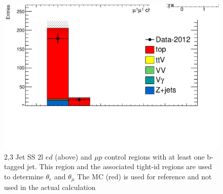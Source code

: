 \begin{figure}[htbp]
\begin{minipage}[h]{0.5\textwidth}
  \end{minipage}\hfill
  \begin{minipage}[h]{0.5\textwidth}
    \centering \includegraphics[width=\textwidth]{figs/fake/TaT-23jets-1b_nb_mm}
  \end{minipage}\hfill

  \caption{2,3 Jet SS 2l  $ed$ (above) and $\mu p$ control regions with at least one b-tagged jet. This region
    and the associated tight-id regions are used to determine $\theta_e$ and $\theta_{\mu}$ The \ttbar MC (red) is
  used for reference and not used in the actual calculation}
  \label{figure:background_23jets}
 \end{figure}

